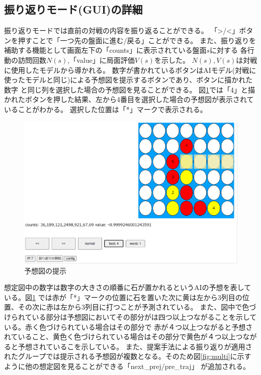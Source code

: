 \subsection{振り返りモード(GUI)の詳細}
振り返りモードでは直前の対戦の内容を振り返ることができる。
「>/<」ボタンを押すことで「一つ先の盤面に進む/戻る」ことができる。
また、振り返りを補助する機能として画面左下の「counts」に表示されている盤面$s$に対する
各行動の訪問回数$N(s)$,「value」に局面評価$V(s)$を示した。
$N(s),V(s)$は対戦に使用したモデルから導かれる。
数字が書かれているボタンはAIモデル(対戦に使ったモデルと同じ)による予想図を提示するボタンであり、ボタンに描かれた数字
と同じ列を選択した場合の予想図を見ることができる。
図\ref{fig:number-button}では「4」と描かれたボタンを押した結果、左から4番目を選択した場合の予想図が表示されていることがわかる。
選択した位置は「*」マークで表示される。
\begin{figure}[t]
	\centering
    \includegraphics[width=\linewidth]{./figure/trajSystem.pdf}
	\caption{予想図の提示}
	\label{fig:number-button}
\end{figure}
想定図中の数字は数字の大きさの順番に石が置かれるというAIの予想を表している。図\ref{fig:number-button}
では赤が「*」マークの位置に石を置いた次に黄は左から3列目の位置、その次に赤は左から3列目に打つことが予測されている。
また、図中で色づけられている部分は予想図においてその部分がは四つ以上つながることを示している。赤く色づけられている場合はその部分で
赤が４つ以上つながると予想されていること、黄色く色づけられている場合はその部分で黄色が４つ以上つながると予想されているこを示している。
また、提案手法による振り返りが適用されたグループでは提示される予想図が複数となる。そのため図\ref{fig:multi}に示すように他の想定図を見ることができる「next\_prej/pre\_traj」
が追加される。
